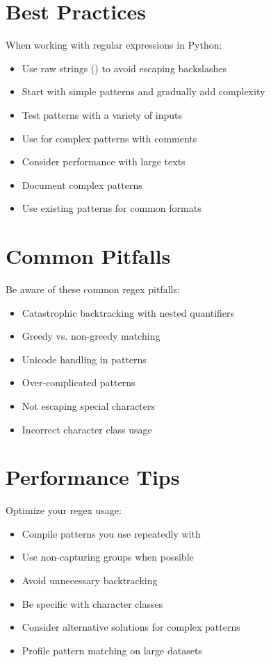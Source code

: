 \section{Best Practices}

When working with regular expressions in Python:

\begin{itemize}
    \item Use raw strings () to avoid escaping backslashes
    \item Start with simple patterns and gradually add complexity
    \item Test patterns with a variety of inputs
    \item Use  for complex patterns with comments
    \item Consider performance with large texts
    \item Document complex patterns
    \item Use existing patterns for common formats
\end{itemize}

\section{Common Pitfalls}

Be aware of these common regex pitfalls:

\begin{itemize}
    \item Catastrophic backtracking with nested quantifiers
    \item Greedy vs. non-greedy matching
    \item Unicode handling in patterns
    \item Over-complicated patterns
    \item Not escaping special characters
    \item Incorrect character class usage
\end{itemize}

\section{Performance Tips}

Optimize your regex usage:

\begin{itemize}
    \item Compile patterns you use repeatedly with 
    \item Use non-capturing groups  when possible
    \item Avoid unnecessary backtracking
    \item Be specific with character classes
    \item Consider alternative solutions for complex patterns
    \item Profile pattern matching on large datasets
\end{itemize}

